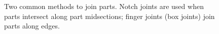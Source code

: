 \begin{figure}[b]
\centering 
{}
\caption[Two common notch types]{Two common methods to join
  parts. Notch joints are used when parts intersect along part
  midsections; finger joints (box joints) join parts along edges.}
\label{fig:joint}
\end{figure}
